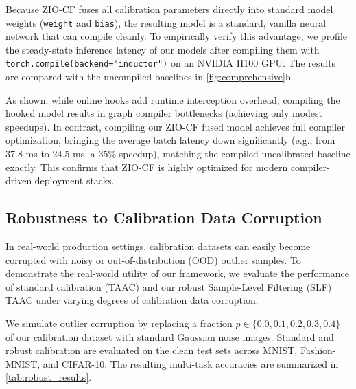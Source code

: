 \documentclass{article}
\begin{document}
Because ZIO-CF fuses all calibration parameters directly into standard model weights (\texttt{weight} and \texttt{bias}), the resulting model is a standard, vanilla neural network that can compile cleanly. To empirically verify this advantage, we profile the steady-state inference latency of our models after compiling them with \texttt{torch.compile(backend="inductor")} on an NVIDIA H100 GPU. The results are compared with the uncompiled baselines in \cref{fig:comprehensive}b.

As shown, while online hooks add runtime interception overhead, compiling the hooked model results in graph compiler bottlenecks (achieving only modest speedups). In contrast, compiling our ZIO-CF fused model achieves full compiler optimization, bringing the average batch latency down significantly (e.g., from 37.8 ms to 24.5 ms, a 35\% speedup), matching the compiled uncalibrated baseline exactly. This confirms that ZIO-CF is highly optimized for modern compiler-driven deployment stacks.

\subsection{Robustness to Calibration Data Corruption}
In real-world production settings, calibration datasets can easily become corrupted with noisy or out-of-distribution (OOD) outlier samples. To demonstrate the real-world utility of our framework, we evaluate the performance of standard calibration (TAAC) and our robust Sample-Level Filtering (SLF) TAAC under varying degrees of calibration data corruption.

We simulate outlier corruption by replacing a fraction $p \in \{0.0, 0.1, 0.2, 0.3, 0.4\}$ of our calibration dataset with standard Gaussian noise images. Standard and robust calibration are evaluated on the clean test sets across MNIST, Fashion-MNIST, and CIFAR-10. The resulting multi-task accuracies are summarized in \cref{tab:robust_results}.
\end{document}
